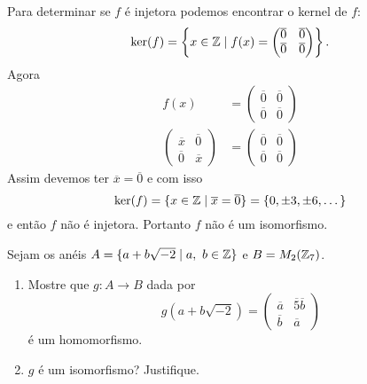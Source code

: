 \documentclass[12pt]{exam}
\begin{document}
\begin{enumerate}[label=({\alph*})]
        Para determinar se $f$ é injetora podemos encontrar o kernel de $f$:
        \[
            \ker(f) = \left\{x \in \mathbb{Z} \mid f(x) = \begin{pmatrix}
                \overline{0} & \overline{0}\\\overline{0} & \overline{0}
            \end{pmatrix}\right\}.
        \]
        Agora
        \begin{align*}
            f(x) &= \begin{pmatrix}
                \overline{0} & \overline{0}\\\overline{0} & \overline{0}
            \end{pmatrix}\\
            \begin{pmatrix}
                \overline{x} & \overline{0}\\\overline{0} & \overline{x}
            \end{pmatrix} &= \begin{pmatrix}
            \overline{0} & \overline{0}\\\overline{0} & \overline{0}
            \end{pmatrix}
        \end{align*}
        Assim devemos ter $\overline{x} = \overline{0}$ e com isso
        \[
            \ker(f) = \{x \in \mathbb{Z} \mid \overline{x} = \overline{0}\} = \{0, \pm 3, \pm 6, \dots\}
        \]
        e então $f$ não é injetora. Portanto $f$ não é um isomorfismo.
    \end{enumerate}
    \vspace{.4cm}

    \questao Sejam os anéis $A = \{ a + b\sqrt{-2} \mid a,\ b \in \mathbb{Z}\}$ e $B = M_2(\mathbb{Z}_7)$.
    \begin{enumerate}[label=({\alph*})]
        \item Mostre que $g : A \to B$ dada por
        \[
            g(a + b\sqrt{-2}) =
            \begin{pmatrix}
                \overline{a} & \overline{5}\overline{b}\\
                \overline{b} & \overline{a}
            \end{pmatrix}
        \]
        é um homomorfismo.

        \item $g$ é um isomorfismo? Justifique.
    \end{enumerate}
\end{document}
